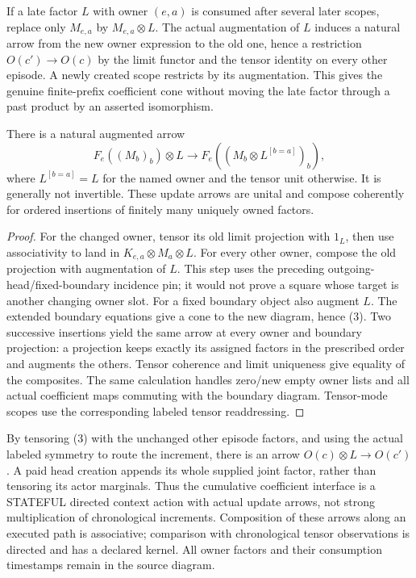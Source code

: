 \documentclass[11pt]{article}\usepackage{amsmath,amssymb,amsthm}
\begin{document}
If a late factor $L$ with owner $(e,a)$ is consumed after several later scopes, replace only $M_{e,a}$ by $M_{e,a}\otimes L$. The actual augmentation of $L$ induces a natural arrow from the new owner expression to the old one, hence a restriction $O(c')\to O(c)$ by the limit functor and the tensor identity on every other episode. A newly created scope restricts by its augmentation. This gives the genuine finite-prefix coefficient cone without moving the late factor through a past product by an asserted isomorphism.

\begin{proposition}
There is a natural augmented arrow
\[
 F_e((M_b)_b)\otimes L\longrightarrow
 F_e((M_b\otimes L^{[b=a]})_b),\tag{3}
\]
where $L^{[b=a]}=L$ for the named owner and the tensor unit otherwise. It is generally not invertible. These update arrows are unital and compose coherently for ordered insertions of finitely many uniquely owned factors.
\end{proposition}
\begin{proof}
For the changed owner, tensor its old limit projection with $1_L$, then use associativity to land in $K_{e,a}\otimes M_a\otimes L$. For every other owner, compose the old projection with augmentation of $L$. This step uses the preceding outgoing-head/fixed-boundary incidence pin; it would not prove a square whose target is another changing owner slot. For a fixed boundary object also augment $L$. The extended boundary equations give a cone to the new diagram, hence (3). Two successive insertions yield the same arrow at every owner and boundary projection: a projection keeps exactly its assigned factors in the prescribed order and augments the others. Tensor coherence and limit uniqueness give equality of the composites. The same calculation handles zero/new empty owner lists and all actual coefficient maps commuting with the boundary diagram. Tensor-mode scopes use the corresponding labeled tensor readdressing.\end{proof}

By tensoring (3) with the unchanged other episode factors, and using the actual labeled symmetry to route the increment, there is an arrow $O(c)\otimes L\to O(c')$. A paid head creation appends its whole supplied joint factor, rather than tensoring its actor marginals. Thus the cumulative coefficient interface is a STATEFUL directed context action with actual update arrows, not strong multiplication of chronological increments. Composition of these arrows along an executed path is associative; comparison with chronological tensor observations is directed and has a declared kernel. All owner factors and their consumption timestamps remain in the source diagram.
\end{document}
